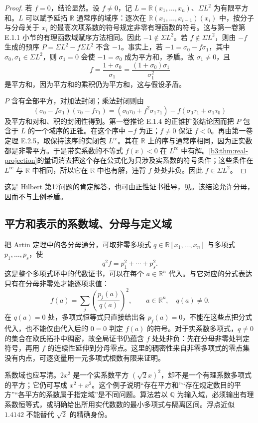\begin{proof}
	若 \(f=0\)，结论显然。设 \(f\ne0\)，记 \(L=\mathbb R(x_1,\ldots,x_n)\)、\(\Sigma L^2\) 为有限平方和。\(L\) 可以赋予延拓 \(\mathbb R\) 通常序的域序：逐次在 \(\mathbb R(x_1,\ldots,x_{i-1})(x_i)\) 中，按分子与分母关于 \(x_i\) 的最高次项系数的符号规定非零有理函数的符号。这与第一卷第 E.1.1 小节的有理函数域赋序方法相同。因此 \(-1\notin\Sigma L^2\)。若 \(f\notin\Sigma L^2\)，则由 \(-f\) 生成的预序 \(P=\Sigma L^2-f\Sigma L^2\) 不含 \(-1\)。事实上，若 \(-1=\sigma_0-f\sigma_1\)，其中 \(\sigma_0,\sigma_1\in\Sigma L^2\)，则 \(\sigma_1=0\) 会使 \(-1=\sigma_0\) 成为平方和，矛盾。故 \(\sigma_1\ne0\)，且
	\[
		f=\frac{1+\sigma_0}{\sigma_1} =\frac{(1+\sigma_0)\sigma_1}{\sigma_1^2}
	\]
	是平方和，因为平方和的乘积仍为平方和，这与假设矛盾。

	\(P\) 含有全部平方，对加法封闭；乘法封闭则由
	\[
		(\sigma_0-f\sigma_1)(\tau_0-f\tau_1) =(\sigma_0\tau_0+f^2\sigma_1\tau_1) -f(\sigma_0\tau_1+\sigma_1\tau_0)
	\]
	及平方和对和、积的封闭性得到。第一卷推论 E.1.4 的正锥扩张结论因而把 \(P\) 包含于 \(L\) 的一个域序的正锥。在这个序中 \(-f\) 为正；\(f\ne0\) 保证 \(f<0\)。再由第一卷定理 E.2.5，取保持该序的实闭包 \(L^{\mathrm{rc}}\)。其在 \(\mathbb R\) 上的序与通常序相同，因为正实数都是非零平方。于是带实系数的不等式 \(f(x)<0\) 在 \(L^{\mathrm{rc}}\) 中有解。\cref{b3:thm:real-projection}的量词消去把这个存在公式化为只涉及实系数的符号条件；这些条件在 \(L^{\mathrm{rc}}\) 与 \(\mathbb R\) 中相同，所以它在 \(\mathbb R\) 中也有解，违背 \(f\) 处处非负。因此 \(f\in\Sigma L^2\)。
\end{proof}

这是 Hilbert 第17问题的肯定解答，也可由正性证书推导，见\cite[Section 7.4, Corollary 7.6]{Sturmfels2002PolynomialEquations}。该结论允许分母，因而不与上例矛盾。

\subsection{平方和表示的系数域、分母与定义域}
\label{b3:subsec:G03:03}

把 Artin 定理中的各分母通分，可取非零多项式 \(q\in\mathbb R[x_1,\ldots,x_n]\) 与多项式 \(p_1,\ldots,p_s\)，使
\[
	\boxed{q^2f=p_1^2+\cdots+p_s^2.}
\]
这是整个多项式环中的代数证书，可以在每个 \(a\in\mathbb R^n\) 代入。与它对应的分式表达只有在分母非零处才能逐项求值：
\[
	f(a)=\sum_j\left(\frac{p_j(a)}{q(a)}\right)^2, \qquad a\in\mathbb R^n,\quad q(a)\ne0.
\]
在 \(q(a)=0\) 处，多项式恒等式只直接给出各 \(p_j(a)=0\)，不能在这些点把分式代入，也不能仅由代入后的 \(0=0\) 判定 \(f(a)\) 的符号。对于实系数多项式，\(q\ne0\) 的集合在欧氏拓扑中稠密，故全局证书仍蕴含 \(f\) 处处非负：先在分母非零处判定符号，再用 \(f\) 的连续性延伸到分母零点。这里的稠密性来自非零多项式的零点集没有内点，可逐变量用一元多项式根数有限来证明。

\ProseParagraphBreak
系数域也应写清。\(2x^2\) 是一个实系数平方 \((\sqrt2x)^2\)，却不是一个有理系数多项式的平方；它仍可写成 \(x^2+x^2\)。这个例子说明“存在平方和”“存在规定数目的平方”“各平方的系数属于指定域”是不同问题。算法若以 \(\mathbb Q\) 为输入域，必须输出有理系数恒等式，或明确给出所用实代数数的最小多项式与隔离区间。浮点近似 \(1.4142\) 不能替代 \(\sqrt2\) 的精确身份。
